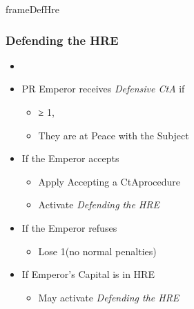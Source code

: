 \documentclass[10pt]{article}
\newlength{\fhDefHre} \setlength\fhDefHre{16\baselineskip}
\begin{document}
\begin{dynamiccontents*}{frameDefHre}\begin{eubox}{\fhDefHre}
	\subsubsection*{Defending the HRE }
	\begin{itemize}
			\item {}
			\item PR Emperor receives \emph{Defensive CtA} if
		\begin{itemize}
			\item \authority ≥ 1, 
			\item They are at Peace with the Subject
		\end{itemize}
		\item If the Emperor accepts
		\begin{itemize}
			\item Apply \dprime Accepting a CtA\dprime procedure
			\item {}Activate \emph{Defending the HRE}
		\end{itemize}
		\item If the Emperor refuses
		\begin{itemize}
			\item Lose 1\authority (no normal penalties)
		\end{itemize}
	\end{itemize}
	\begin{itemize}
		\item If Emperor's Capital is in HRE
		\begin{itemize}
			\item {}May activate \emph{Defending the HRE}
			\begin{itemize}
			\end{itemize}
		\end{itemize}
	\end{itemize}
\end{eubox}\end{dynamiccontents*}
\end{document}
